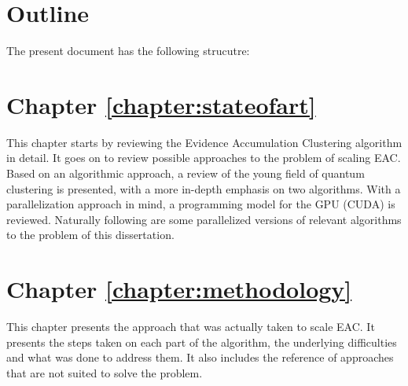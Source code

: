 


\section{Outline}

The present document has the following strucutre:

\section*{Chapter \ref{chapter:stateofart}}

This chapter starts by reviewing the Evidence Accumulation Clustering algorithm in detail.
It goes on to review possible approaches to the problem of scaling EAC.
Based on an algorithmic approach, a review of the young field of quantum clustering is presented, with a more in-depth emphasis on two algorithms.
With a parallelization approach in mind, a programming model for the GPU (CUDA) is reviewed.
Naturally following are some parallelized versions of relevant algorithms to the problem of this dissertation.

\section*{Chapter \ref{chapter:methodology}}

This chapter presents the approach that was actually taken to scale EAC.
It presents the steps taken on each part of the algorithm, the underlying difficulties and what was done to address them.
It also includes the reference of approaches that are not suited to solve the problem.

